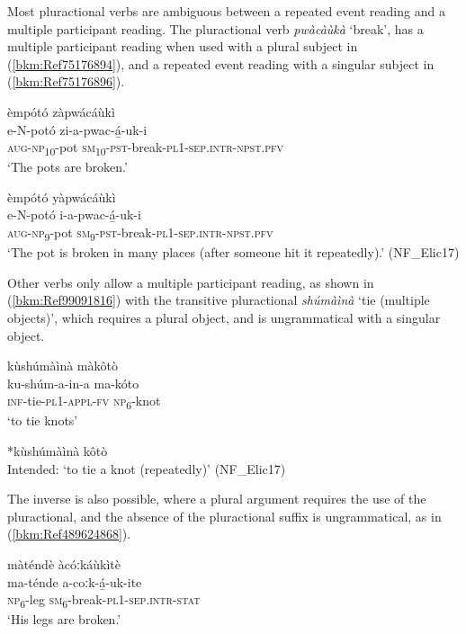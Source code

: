 Most pluractional verbs are ambiguous between a repeated event reading and a multiple participant reading. The pluractional verb \textit{pwàcàùkà} ‘break’, has a multiple participant reading when used with a plural subject in (\ref{bkm:Ref75176894}), and a repeated event reading with a singular subject in (\ref{bkm:Ref75176896}).

\ea
\label{bkm:Ref75176894}
èmpótó zàpwácáùkì\\
\gll e-N-potó    zi-a-pwac-á̲-uk-i\\
\textsc{aug}-\textsc{np}\textsubscript{10}-pot  \textsc{sm}\textsubscript{10}-\textsc{pst}-break-\textsc{pl}1-\textsc{sep}.\textsc{intr}-\textsc{npst}.\textsc{pfv}\\
\glt ‘The pots are broken.’
\z

\ea
\label{bkm:Ref75176896}
èmpótó yàpwácáùkì\\
\gll e-N-potó  i-a-pwac-á̲-uk-i\\
\textsc{aug}-\textsc{np}\textsubscript{9}-pot  \textsc{sm}\textsubscript{9}-\textsc{pst}-break-\textsc{pl}1-\textsc{sep}.\textsc{intr}-\textsc{npst}.\textsc{pfv}\\
\glt ‘The pot is broken in many places (after someone hit it repeatedly).’ (NF\_Elic17)
\z

Other verbs only allow a multiple participant reading, as shown in (\ref{bkm:Ref99091816}) with the transitive pluractional \textit{shúmàìnà} ‘tie (multiple objects)’, which requires a plural object, and is ungrammatical with a singular object.

\ea
\label{bkm:Ref99091816}
\ea
kùshúmàìnà màkôtò\\
\gll ku-shúm-a-in-a    ma-kóto\\
\textsc{inf}-tie-\textsc{pl}1-\textsc{appl}-\textsc{fv}    \textsc{np}\textsubscript{6}-knot\\
\glt ‘to tie knots’

\ex
  *kùshúmàìnà kôtò\\
Intended: ‘to tie a knot (repeatedly)’ (NF\_Elic17)
\z\z

The inverse is also possible, where a plural argument requires the use of the pluractional, and the absence of the pluractional suffix is ungrammatical, as in (\ref{bkm:Ref489624868}).

\ea
\label{bkm:Ref489624868}
\ea
màténdè àcóːkáùkìtè\\
\gll ma-ténde  a-coːk-á̲-uk-ite\\
\textsc{np}\textsubscript{6}-leg  \textsc{sm}\textsubscript{6}-break-\textsc{pl}1-\textsc{sep}.\textsc{intr}-\textsc{stat}\\
\glt ‘His legs are broken.’

